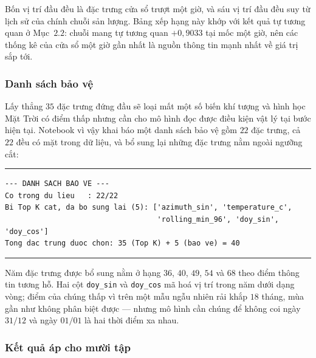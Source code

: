 \documentclass[12pt, a4paper]{report}
\begin{document}
Bốn vị trí đầu đều là đặc trưng cửa sổ trượt một giờ, và sáu vị trí đầu đều suy từ lịch sử của
chính chuỗi sản lượng. Bảng xếp hạng này khớp với kết quả tự tương quan ở Mục~$2.2$: chuỗi mang
tự tương quan $+0{,}9033$ tại mốc một giờ, nên các thống kê của cửa sổ một giờ gần nhất là nguồn
thông tin mạnh nhất về giá trị sắp tới.

\subsubsection{Danh sách bảo vệ}

Lấy thẳng $35$ đặc trưng đứng đầu sẽ loại mất một số biến khí tượng và hình học Mặt Trời có điểm
thấp nhưng cần cho mô hình đọc được điều kiện vật lý tại bước hiện tại. Notebook vì vậy khai báo
một danh sách bảo vệ gồm $22$ đặc trưng, cả $22$ đều có mặt trong dữ liệu, và bổ sung lại những
đặc trưng nằm ngoài ngưỡng cắt:

\begingroup
\par\vspace{6pt}\hrule\vspace{4pt}
\footnotesize\renewcommand{\baselinestretch}{1.0}\selectfont
\begin{verbatim}
--- DANH SACH BAO VE ---
Co trong du lieu   : 22/22
Bi Top K cat, da bo sung lai (5): ['azimuth_sin', 'temperature_c',
                                   'rolling_min_96', 'doy_sin', 'doy_cos']
Tong dac trung duoc chon: 35 (Top K) + 5 (bao ve) = 40
\end{verbatim}
\vspace{2pt}\hrule\par\vspace{6pt}
\endgroup

Năm đặc trưng được bổ sung nằm ở hạng $36$, $40$, $49$, $54$ và $68$ theo điểm thông tin tương
hỗ. Hai cột \texttt{doy\_sin} và \texttt{doy\_cos} mã hoá vị trí trong năm dưới dạng vòng; điểm của
chúng thấp vì trên một mẫu ngẫu nhiên rải khắp $18$ tháng, mùa gần như không phân biệt được ---
nhưng mô hình cần chúng để không coi ngày $31/12$ và ngày $01/01$ là hai thời điểm xa nhau.

\subsubsection{Kết quả áp cho mười tập}
\end{document}
